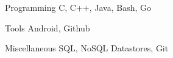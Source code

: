 

\begin{cvskills}

  \cvskill
    {Programming} %
    {C, C++, Java, Bash, Go} %

  \cvskill
    {Tools} %
    {Android, Github} %

  \cvskill
    {Miscellaneous} %
    {SQL, NoSQL Datastores, Git} %

\end{cvskills}
